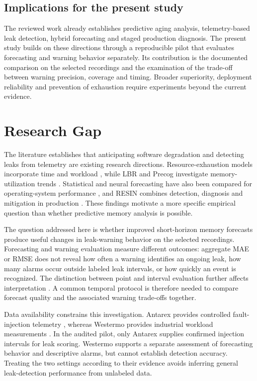 \documentclass[10pt,a4paper,twocolumn]{article}
\begin{document}
\subsection{Implications for the present study}

The reviewed work already establishes predictive aging analysis, telemetry-based leak detection, hybrid forecasting and staged production diagnosis. The present study builds on these directions through a reproducible pilot that evaluates forecasting and warning behavior separately. Its contribution is the documented comparison on the selected recordings and the examination of the trade-off between warning precision, coverage and timing. Broader superiority, deployment reliability and prevention of exhaustion require experiments beyond the current evidence.

\section{Research Gap}

The literature establishes that anticipating software degradation and detecting leaks from telemetry are existing research directions. Resource-exhaustion models incorporate time and workload \cite{ref8}, while LBR and Precog investigate memory-utilization trends \cite{ref1}. Statistical and neural forecasting have also been compared for operating-system performance \cite{ref2}, and RESIN combines detection, diagnosis and mitigation in production \cite{ref21}. These findings motivate a more specific empirical question than whether predictive memory analysis is possible.

The question addressed here is whether improved short-horizon memory forecasts produce useful changes in leak-warning behavior on the selected recordings. Forecasting and warning evaluation measure different outcomes: aggregate MAE or RMSE does not reveal how often a warning identifies an ongoing leak, how many alarms occur outside labeled leak intervals, or how quickly an event is recognized. The distinction between point and interval evaluation further affects interpretation \cite{ref41,ref42,ref43,ref44}. A common temporal protocol is therefore needed to compare forecast quality and the associated warning trade-offs together.

Data availability constrains this investigation. Antarex provides controlled fault-injection telemetry \cite{ref3,ref4,ref5}, whereas Westermo provides industrial workload measurements \cite{ref6}. In the audited pilot, only Antarex supplies confirmed injection intervals for leak scoring. Westermo supports a separate assessment of forecasting behavior and descriptive alarms, but cannot establish detection accuracy. Treating the two settings according to their evidence avoids inferring general leak-detection performance from unlabeled data.
\end{document}
